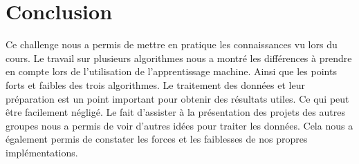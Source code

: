 \chapter{Conclusion}
Ce challenge nous a permis de mettre en pratique les connaissances vu lors du cours. Le travail sur plusieurs algorithmes nous a montré les différences à prendre en compte lors de l'utilisation de l'apprentissage machine. Ainsi que les points forts et faibles des trois algorithmes.
Le traitement des données et leur préparation est un point important pour obtenir des résultats utiles. Ce qui peut être facilement négligé. Le fait d'assister à la présentation des projets des autres groupes nous a permis de voir d'autres idées pour traiter les données. Cela nous a également permis de constater les forces et les faiblesses de nos propres implémentations.